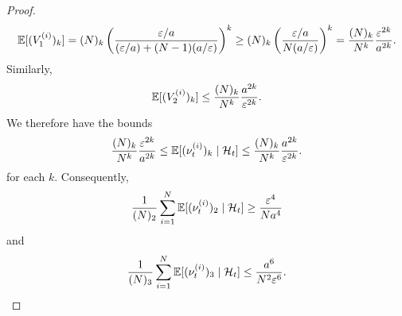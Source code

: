 \begin{proof}
\begin{equation*}
\mathbb{E}[ (V_1^{(i)})_k ]
= (N)_k \left( \frac{ \varepsilon/a }{ (\varepsilon/a) + (N-1)(a/\varepsilon) } \right)^k
\geq (N)_k \left( \frac{ \varepsilon/a }{ N(a/\varepsilon) } \right)^k
= \frac{(N)_k}{N^k} \frac{\varepsilon^{2k}}{a^{2k}} .
\end{equation*}
Similarly, 
\begin{equation*}
\mathbb{E}[ (V_2^{(i)})_k ]
\leq \frac{(N)_k}{N^k} \frac{a^{2k}}{\varepsilon^{2k}} .
\end{equation*}
We therefore have the bounds
\begin{equation*}
\frac{(N)_k}{N^k} \frac{\varepsilon^{2k}}{a^{2k}}
\leq \E[ (\nu_t^{(i)})_k \mid \mathcal{H}_t ]
\leq \frac{(N)_k}{N^k} \frac{a^{2k}}{\varepsilon^{2k}} . %
\end{equation*}
for each $k$. Consequently,
\begin{equation}
\frac{1}{(N)_2} \sum_{i=1}^N \mathbb{E}[ (\nu_t^{(i)})_2 \mid \mathcal{H}_t ]
\geq \frac{\varepsilon^4}{Na^4} \label{eq:mn_cN_LB}
\end{equation}
and
\begin{equation}
\frac{1}{(N)_3} \sum_{i=1}^N \mathbb{E}[ (\nu_t^{(i)})_3 \mid \mathcal{H}_t ]
\leq \frac{a^6}{N^2 \varepsilon^6} . \label{eq:mn_cN3_UB}
\end{equation}
%
%

\end{proof}
